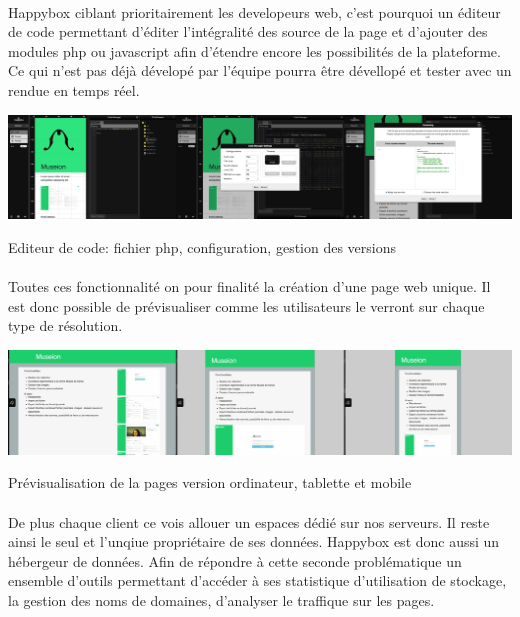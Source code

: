 \documentclass[11pt, a4paper ]{article}
\begin{document}
\begin{spacing}{1.5}
\paragraph{} %
Happybox ciblant prioritairement les developeurs web, c'est pourquoi un éditeur de code permettant d'éditer l'intégralité des source de la page et d'ajouter des modules php ou javascript afin d'étendre encore les possibilités de la plateforme. Ce qui n'est pas déjà dévelopé par l'équipe pourra être dévellopé et tester avec un rendue en temps réel.
\begin{center}
	\includegraphics[width=\textwidth]{images/HBscreen/codeManager.png}
	\caption{Editeur de code: fichier php, configuration, gestion des versions}
\end{center}

\paragraph{}

Toutes ces fonctionnalité on pour finalité la création d'une page web unique. Il est donc possible de prévisualiser comme les utilisateurs le verront sur chaque type de résolution.
\begin{center}
	\includegraphics[width=\textwidth]{images/HBscreen/preview.png}
	\caption{Prévisualisation de la pages version ordinateur, tablette et mobile}
\end{center}

\paragraph{}
De plus chaque client ce vois allouer un espaces dédié sur nos serveurs. Il reste ainsi le seul et l'unqiue propriétaire de ses données. Happybox est donc aussi un hébergeur de données. Afin de répondre à cette seconde problématique un ensemble d'outils permettant d'accéder à ses statistique d'utilisation de stockage, la gestion des noms de domaines, d'analyser le traffique sur les pages.


\end{spacing}
\end{document}
